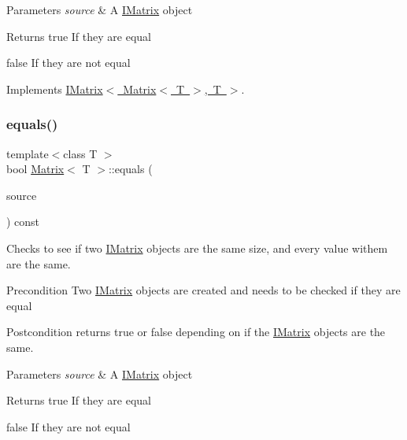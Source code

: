 \begin{DoxyParams}{Parameters}
{\em source} & A \mbox{\hyperlink{class_i_matrix}{I\+Matrix}} object \\
\hline
\end{DoxyParams}
\begin{DoxyReturn}{Returns}
true If they are equal 

false If they are not equal 
\end{DoxyReturn}


Implements \mbox{\hyperlink{class_i_matrix_afa03122ed7ddb531656ce27690f8fb03}{I\+Matrix$<$ Matrix$<$ T $>$, T $>$}}.

\mbox{\label{class_matrix_a8fb3844da255c2db6c7539559f7957ab}} 
\subsubsection{\texorpdfstring{equals()}{equals()}\hspace{0.1cm}{\footnotesize\ttfamily [2/6]}}
{\footnotesize\ttfamily template$<$class T $>$ \\
bool \mbox{\hyperlink{class_matrix}{Matrix}}$<$ T $>$\+::equals (\begin{DoxyParamCaption}\item[{const \mbox{\hyperlink{class_i_matrix}{I\+Matrix}}$<$ \mbox{\hyperlink{class_t_matrix}{T\+Matrix}}$<$ T $>$, T $>$ \&}]{source }\end{DoxyParamCaption}) const}



Checks to see if two \mbox{\hyperlink{class_i_matrix}{I\+Matrix}} objects are the same size, and every value withem are the same. 

\begin{DoxyPrecond}{Precondition}
Two \mbox{\hyperlink{class_i_matrix}{I\+Matrix}} objects are created and needs to be checked if they are equal 
\end{DoxyPrecond}
\begin{DoxyPostcond}{Postcondition}
returns true or false depending on if the \mbox{\hyperlink{class_i_matrix}{I\+Matrix}} objects are the same.
\end{DoxyPostcond}

\begin{DoxyParams}{Parameters}
{\em source} & A \mbox{\hyperlink{class_i_matrix}{I\+Matrix}} object \\
\hline
\end{DoxyParams}
\begin{DoxyReturn}{Returns}
true If they are equal 

false If they are not equal 
\end{DoxyReturn}
\mbox{\label{class_matrix_ab5c137907e248616966ab336b2974587}} 
